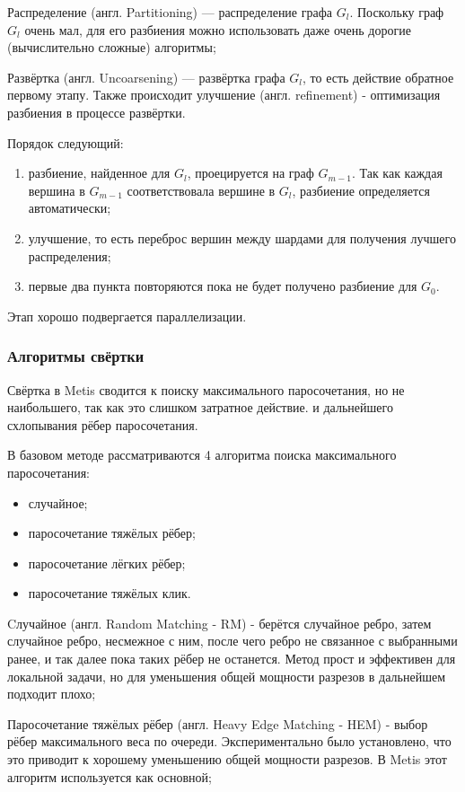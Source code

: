 Распределение (англ. Partitioning) --- распределение графа $G_l$. Поскольку граф $G_l$ очень мал, для его разбиения можно использовать даже очень дорогие (вычислительно сложные) алгоритмы;

Развёртка (англ. Uncoarsening) --- развёртка графа $G_l$, то есть действие обратное первому этапу. Также происходит улучшение (англ. refinement) - оптимизация разбиения в процессе развёртки. 

Порядок следующий:
\begin{enumerate}
    \item разбиение, найденное для $G_l$, проецируется на граф $G_{m-1}$. Так как каждая вершина в $G_{m-1}$ соответствовала вершине в $G_l$, разбиение определяется автоматически;
    \item улучшение, то есть переброс вершин между шардами для получения лучшего распределения;
    \item первые два пункта повторяются пока не будет получено разбиение для $G_0$.
\end{enumerate} 

Этап хорошо подвергается параллелизации.

\subsubsection{Алгоритмы свёртки}

Свёртка в Metis сводится к поиску максимального паросочетания, но не наибольшего, так как это слишком затратное действие. и дальнейшего схлопывания рёбер паросочетания.

В базовом методе рассматриваются 4 алгоритма поиска максимального паросочетания:
\begin{itemize}
    \item случайное;
    \item паросочетание тяжёлых рёбер;
    \item паросочетание лёгких рёбер;
    \item паросочетание тяжёлых клик.
\end{itemize}

Cлучайное (англ. Random Matching - RM) - берётся случайное ребро, затем случайное ребро, несмежное с ним, после чего ребро не связанное с выбранными ранее, и так далее пока таких рёбер не останется. Метод прост и эффективен для локальной задачи, но для уменьшения общей мощности разрезов в дальнейшем подходит плохо;

Паросочетание тяжёлых рёбер (англ. Heavy Edge Matching - HEM) - выбор рёбер максимального веса по очереди. Экспериментально было установлено, что это приводит к хорошему уменьшению общей мощности разрезов. В Metis этот алгоритм используется как основной;

